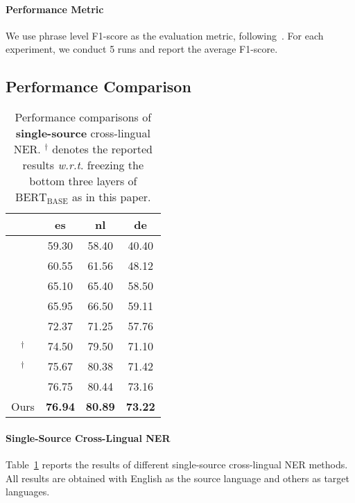 \documentclass[11pt,a4paper]{article}
\newcommand\wrt{\textit{w.r.t}}
\begin{document}
	\paragraph{Performance Metric}
	We use phrase level F1-score as the evaluation metric, following~\citet{tjong2002introduction}. For each experiment, we conduct 5 runs and report the average F1-score. \subsection{Performance Comparison}
	
	\begin{table}[t]
		\centering
		\setlength{\tabcolsep}{1.5mm}
		\begin{tabular}{c|c|c|c}
			\hline
			&	es	&	nl	&	de \\ \hline
			\citet{tackstrom2012cross}& 59.30 & 58.40	& 40.40 \\ \hline
			\citet{tsai2016cross}& 60.55	& 61.56	& 48.12 \\ \hline
			\citet{ni2017weakly}&	65.10 &	65.40 &	58.50 \\ \hline
			\citet{mayhew2017cheap}& 65.95	& 66.50	& 59.11	\\ \hline
			\citet{xie2018neural}& 72.37	& 71.25	& 57.76	\\ \hline
\citet{wu2019beto}$^{\dag}$&	74.50 &	79.50 &	71.10 \\ \hline
			\citet{moon2019lingua}$^{\dag}$ & 75.67 & 80.38 & 71.42\\ \hline
			\citet{wu2020enhanced}&	76.75 &	80.44 &	73.16 \\ \hline
			\hline
Ours & \textbf{76.94} & \textbf{80.89} & \textbf{73.22} \\ \hline
		\end{tabular}
		\caption{Performance comparisons of \textbf{single-source} cross-lingual NER. $^{\dag}$ denotes the reported results \wrt. freezing the bottom three layers of $\text{BERT}_{\text{BASE}}$ as in this paper.}
\label{tab:single_source}
	\end{table}
	

	\paragraph{Single-Source Cross-Lingual NER}
	Table~\ref{tab:single_source} reports the results of different single-source cross-lingual NER methods. 
	All results are obtained with English as the source language and others as target languages. 
	
\end{document}
